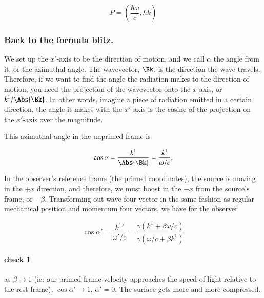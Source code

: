 \begin{equation}\label{eqn:relativisticElectrodynamicsT1:136}
P = \left( \frac{\hbar \omega}{c}, \hbar k \right)
\end{equation}

\subsubsection{Back to the formula blitz.}

We set up the $x'$-axis to be the direction of motion, and we call $\alpha$ the angle from it, or the azimuthal angle.  The wavevector, $\Bk$, is the direction the wave travels. Therefore, if we want to find the angle the radiation makes to the direction of motion, you need the projection of the wavevector onto the $x$-axis, or $k^1/\Abs{\Bk}$. In other words, imagine a piece of radiation emitted in a certain direction, the angle it makes with the $x'$-axis is the cosine of the projection on the $x'$-axis over the magnitude.

This azimuthal angle in the unprimed frame is

\begin{equation}\label{eqn:relativisticElectrodynamicsT1:140} 
\cos \alpha = \frac{k^1}{\Abs{\Bk}} = \frac{k^1}{\omega/c},
\end{equation}

In the observer's reference frame (the primed coordinates), the source is moving in the $+x$ direction, and therefore, we must boost in the $-x$ from the source's frame, or $-\beta$.  Transforming out wave four vector in the same fashion as regular mechanical position and momentum four vectors, we have for the observer

\begin{equation}\label{eqn:relativisticElectrodynamicsT1:140b} 
\cos \alpha' = \frac{{k^1}'}{\omega'/c} = \frac{\gamma (k^1 + \beta \omega/c)}{\gamma(\omega/c + \beta k^1)}
\end{equation}


\paragraph{check 1}

as $\beta \rightarrow 1$ (ie: our primed frame velocity approaches the speed of light relative to the rest frame), $\cos \alpha' \rightarrow 1$, $\alpha' = 0$.  The surface gets more and more compressed.

